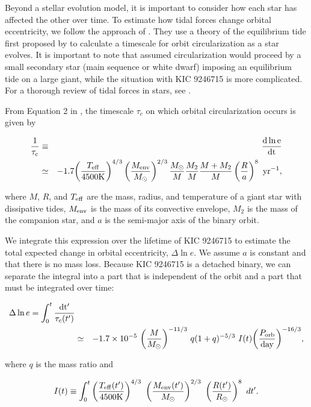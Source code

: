 Beyond a stellar evolution model, it is important to consider how each star has affected the other over time. To estimate how tidal forces change orbital eccentricity, we follow the approach of \citet{ver95}. They use a theory of the equilibrium tide first proposed by \citet{zah77} to calculate a timescale for orbit circularization as a star evolves. It is important to note that \citet{ver95} assumed circularization would proceed by a small secondary star (main sequence or white dwarf) imposing an equilibrium tide on a large giant, while the situation with KIC 9246715 is more complicated. For a thorough review of tidal forces in stars, see \citet{ogi14}.

From Equation 2 in \citet{ver95}, the timescale $\tau_c$ on which orbital circularization occurs is given by

\begin{eqnarray}
\frac{1}{\tau_c} & \equiv &
\frac{\rm{d} \ln e}{\rm{d}t} \nonumber \\
& \simeq & -1.7 {\left( \frac{T_{\rm{eff}}}{4500 \rm{K}} \right)}^{4/3} \left( \frac{M_{\rm{env}}}{M_{\odot}} \right)^{2/3} \frac{M_{\odot}}{M} \frac{M_2}{M} \frac{M+M_2}{M} \left( \frac{R}{a} \right)^8 \ \rm{yr}^{-1},
\end{eqnarray}

where $M$, $R$, and $T_{\rm{eff}}$ are the mass, radius, and temperature of a giant star with dissipative tides, $M_{\rm{env}}$ is the mass of its convective envelope, $M_2$ is the mass of the companion star, and $a$ is the semi-major axis of the binary orbit.

We integrate this expression over the lifetime of KIC 9246715 to estimate the total expected change in orbital eccentricity, $\Delta \ln e$. We assume $a$ is constant and that there is no mass loss. Because KIC 9246715 is a detached binary, we can separate the integral into a part that is independent of the orbit and a part that must be integrated over time:

\begin{eqnarray}\label{tide1}
\Delta \ln e = \int_0^t \frac{\rm{d}t'}{\tau_c(t')} \nonumber \\
& \simeq & -1.7 \times 10^{-5} \ {\left( \frac{M}{M_{\odot}} \right)}^{-11/3} \ q(1+q)^{-5/3} \ I(t) {\left( \frac{P_{\rm{orb}}}{\rm{day}} \right)}^{-16/3},
\end{eqnarray}

where $q$ is the mass ratio and

\begin{equation}
I(t) \equiv \int_0^t \left( \frac{T_{\rm{eff}}(t')}{4500 \rm{K}} \right)^{4/3} \ \left( \frac{M_{\rm{env}}(t')}{M_{\odot}} \right)^{2/3} \ \left( \frac{R(t')}{R_{\odot}} \right)^8 \ dt'.
\end{equation}

